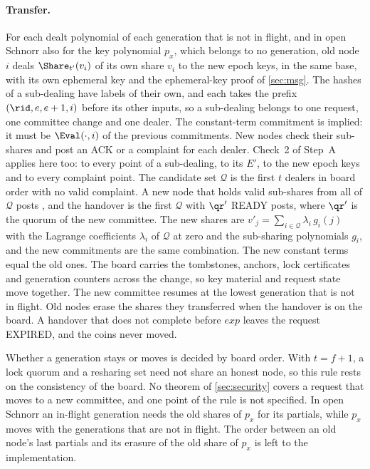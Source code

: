 \paragraph{Transfer.} For each dealt polynomial of each generation that is not in flight, and in open Schnorr also for the key polynomial $p_x$, which belongs to no generation, old node $i$ deals $\Share_{t'}(v_i)$ of its own share $v_i$ to the new epoch keys, in the same base, with its own ephemeral key and the ephemeral-key proof of \cref{sec:msg}. The hashes of a sub-dealing have labels of their own, and each takes the prefix $(\rid, e, e+1, i)$ before its other inputs, so a sub-dealing belongs to one request, one committee change and one dealer. The constant-term commitment is implied: it must be $\Eval(\cdot, i)$ of the previous commitments. New nodes check their sub-shares and post an ACK or a complaint for each dealer. Check~2 of Step~A applies here too: to every point of a sub-dealing, to its $E'$, to the new epoch keys and to every complaint point. The candidate set $\mathcal{Q}$ is the first $t$ dealers in board order with no valid complaint. A new node that holds valid sub-shares from all of $\mathcal{Q}$ posts , and the handover is the first $\mathcal{Q}$ with $\qr'$ READY posts, where $\qr'$ is the quorum of the new committee. The new shares are $v'_j = \sum_{i \in \mathcal{Q}} \lambda_i\, g_i(j)$ with the Lagrange coefficients $\lambda_i$ of $\mathcal{Q}$ at zero and the sub-sharing polynomials $g_i$, and the new commitments are the same combination. The new constant terms equal the old ones. The board carries the tombstones, anchors, lock certificates and generation counters across the change, so key material and request state move together. The new committee resumes at the lowest generation that is not in flight. Old nodes erase the shares they transferred when the handover is on the board. A handover that does not complete before $exp$ leaves the request \textsf{EXPIRED}, and the coins never moved.

Whether a generation stays or moves is decided by board order. With $t = f+1$, a lock quorum and a resharing set need not share an honest node, so this rule rests on the consistency of the board. No theorem of \cref{sec:security} covers a request that moves to a new committee, and one point of the rule is not specified. In open Schnorr an in-flight generation needs the old shares of $p_x$ for its partials, while $p_x$ moves with the generations that are not in flight. The order between an old node's last partials and its erasure of the old share of $p_x$ is left to the implementation.
